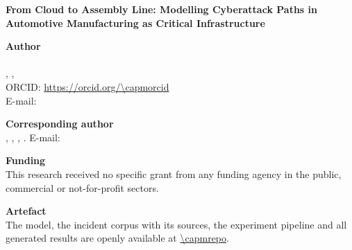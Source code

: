 \documentclass[11pt,a4paper]{article}
\begin{document}
\begin{center}
{\Large\bfseries From Cloud to Assembly Line: Modelling Cyberattack Paths in
Automotive Manufacturing as Critical Infrastructure\par}
\end{center}

\vspace{1.2cm}

\noindent\textbf{Author}\\[2pt]
\capmauthor\\
\capmaffiliation, \capmcity, \capmcountry\\
ORCID: \url{https://orcid.org/\capmorcid}\\
E-mail: \href{mailto:\capmemail}{\capmemail}

\vspace{0.8cm}

\noindent\textbf{Corresponding author}\\[2pt]
\capmauthor, \capmaffiliation, \capmcity, \capmcountry.
E-mail: \href{mailto:\capmemail}{\capmemail}

\vspace{0.8cm}

\noindent\textbf{Funding}\\[2pt]
This research received no specific grant from any funding agency in the public,
commercial or not-for-profit sectors.


\vspace{0.8cm}

\noindent\textbf{Artefact}\\[2pt]
The model, the incident corpus with its sources, the experiment pipeline and all
generated results are openly available at \url{\capmrepo}.
\end{document}
